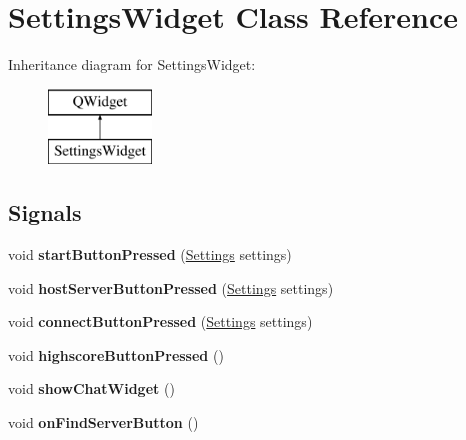 \hypertarget{class_settings_widget}{\section{Settings\-Widget Class Reference}
\label{class_settings_widget}
}
Inheritance diagram for Settings\-Widget\-:\begin{figure}[H]
\begin{center}
\leavevmode
\includegraphics[height=2.000000cm]{class_settings_widget}
\end{center}
\end{figure}
\subsection*{Signals}
\begin{DoxyCompactItemize}
\item 
\hypertarget{class_settings_widget_a0dc3dbbc8b45cae0480cf727ad53c77a}{void {\bfseries start\-Button\-Pressed} (\hyperlink{struct_settings}{Settings} settings)}\label{class_settings_widget_a0dc3dbbc8b45cae0480cf727ad53c77a}

\item 
\hypertarget{class_settings_widget_a3318e4fa37e5fc7aa7b6b272345b9853}{void {\bfseries host\-Server\-Button\-Pressed} (\hyperlink{struct_settings}{Settings} settings)}\label{class_settings_widget_a3318e4fa37e5fc7aa7b6b272345b9853}

\item 
\hypertarget{class_settings_widget_a5d848f32b81af10a30d678816d15fdf4}{void {\bfseries connect\-Button\-Pressed} (\hyperlink{struct_settings}{Settings} settings)}\label{class_settings_widget_a5d848f32b81af10a30d678816d15fdf4}

\item 
\hypertarget{class_settings_widget_a7ee9f48c228d92314768f2e63dcc2b55}{void {\bfseries highscore\-Button\-Pressed} ()}\label{class_settings_widget_a7ee9f48c228d92314768f2e63dcc2b55}

\item 
\hypertarget{class_settings_widget_a30472b488193858a5e1d6205a9f2c14c}{void {\bfseries show\-Chat\-Widget} ()}\label{class_settings_widget_a30472b488193858a5e1d6205a9f2c14c}

\item 
\hypertarget{class_settings_widget_ac8e6df3dc561edb05922fcae047b0074}{void {\bfseries on\-Find\-Server\-Button} ()}\label{class_settings_widget_ac8e6df3dc561edb05922fcae047b0074}

\end{DoxyCompactItemize}
